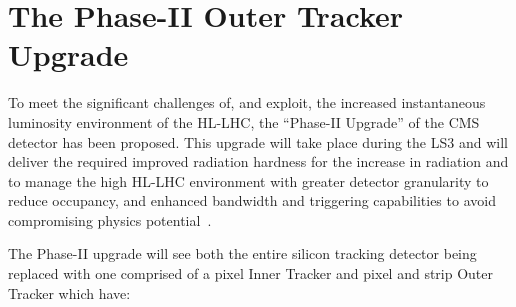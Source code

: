 \section{The Phase-II Outer Tracker Upgrade}\label{sec:tk-upgrade}
To meet the significant challenges of, and exploit, the increased instantaneous luminosity environment of the HL-LHC,
the ``Phase-II Upgrade'' of the CMS detector has been proposed.
This upgrade will take place during the LS3 and will deliver the required improved radiation hardness for the increase in radiation and to manage the high \PU HL-LHC environment with greater detector granularity to reduce occupancy, and enhanced bandwidth and triggering capabilities to avoid compromising physics potential~\cite{CMSCollaboration:2015zni,P2TrackerTDR}.

The Phase-II upgrade will see both the entire silicon tracking detector being replaced with one comprised of a pixel Inner Tracker and pixel and strip Outer Tracker which have:
